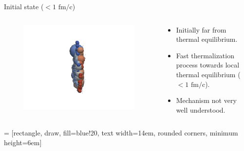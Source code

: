\documentclass[11pt]{beamer}
\begin{document}
\begin{frame}{Initial state ($< 1 \textrm{ fm/c}$)}
\begin{columns}[onlytextwidth]
  \begin{column}{0.25\textwidth}
  \begin{figure}
   	\begin{center}
	\includegraphics[width=\textwidth]{pics/new50.png} 
	\end{center} 	
  	\end{figure} 
  \end{column}
  \begin{column}{0.75\textwidth}
  	\begin{itemize}
	\item Initially far from thermal equilibrium.
	\item Fast thermalization process towards local thermal equilibrium ($< 1 \textrm{ fm/c}$).
	\item Mechanism not very well understood.
\end{itemize}
  \end{column}
\end{columns}  


 = [rectangle, draw, fill=blue!20, 
    text width=14em, rounded corners, minimum height=6em]
\begin{center}
\end{center}


\end{frame}
\end{document}
